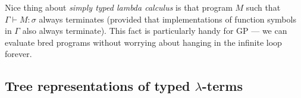 \documentclass[12pt,a4paper]{report}
\newcommand{\lterms}{$\lambda$-terms\xspace}
\newcommand{\turst}[3]{$#1\vdash{}#2:#3$\xspace}
\newcommand{\GMS}{\turst{\Gamma}{M}{\sigma}}
\newenvironment{todo}
{ ~\\[0.5em]
  {\color{red}\textbf{TODO}}
  \begin{easylist}[itemize]}
{ \end{easylist}
  ~}
\begin{document}
 
 
 
%
%
% 
%	


Nice thing about \textit{simply typed lambda calculus} is that
program $M$ such that \GMS always terminates 
(provided that implementations of function symbols in $\Gamma$ 
also always terminate). This fact is particularly handy for
GP --- we can evaluate bred programs without worrying about hanging
in the infinite loop forever.
 





\subsection{Tree representations of typed \lterms}
\label{typed-tree-reps}

\newcommand{\lsCurry}{$\lambda^{\ar}$\nobreakdash-Curry\xspace}
\newcommand{\lsChurch}{$\lambda^{\ar}$\nobreakdash-Church\xspace}
\end{document}
